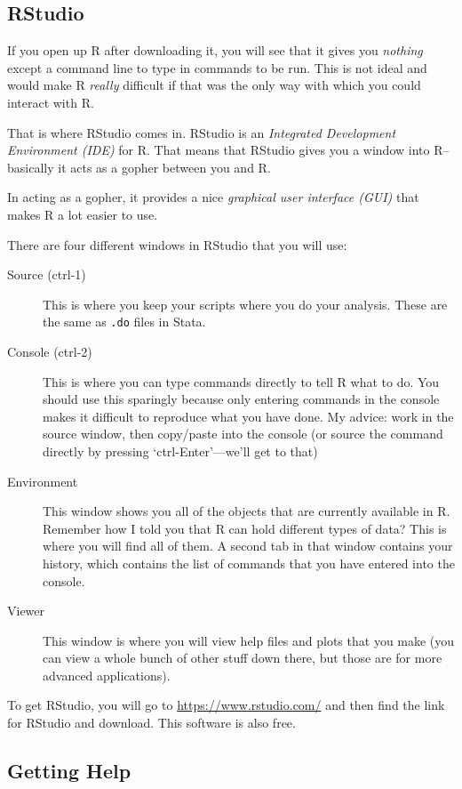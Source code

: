 \documentclass[]{article}
\begin{document}
\subsection{RStudio}\label{rstudio}

If you open up R after downloading it, you will see that it gives you
\emph{nothing} except a command line to type in commands to be run. This
is not ideal and would make R \emph{really} difficult if that was the
only way with which you could interact with R.

That is where RStudio comes in. RStudio is an \emph{Integrated
Development Environment (IDE)} for R. That means that RStudio gives you
a window into R--basically it acts as a gopher between you and R.

In acting as a gopher, it provides a nice \emph{graphical user interface
(GUI)} that makes R a lot easier to use.

There are four different windows in RStudio that you will use:

\begin{description}
\item[Source (ctrl-1)]
This is where you keep your scripts where you do your analysis. These
are the same as {\texttt{.do}} files in Stata.
\item[Console (ctrl-2)]
This is where you can type commands directly to tell R what to do. You
should use this sparingly because only entering commands in the console
makes it difficult to reproduce what you have done. My advice: work in
the source window, then copy/paste into the console (or source the
command directly by pressing `ctrl-Enter'---we'll get to that)
\item[Environment]
This window shows you all of the objects that are currently available in
R. Remember how I told you that R can hold different types of data? This
is where you will find all of them. A second tab in that window contains
your history, which contains the list of commands that you have entered
into the console.
\item[Viewer]
This window is where you will view help files and plots that you make
(you can view a whole bunch of other stuff down there, but those are for
more advanced applications).
\end{description}

To get RStudio, you will go to \url{https://www.rstudio.com/} and then
find the link for RStudio and download. This software is also free.

\subsection{Getting Help}\label{getting-help}
\end{document}
